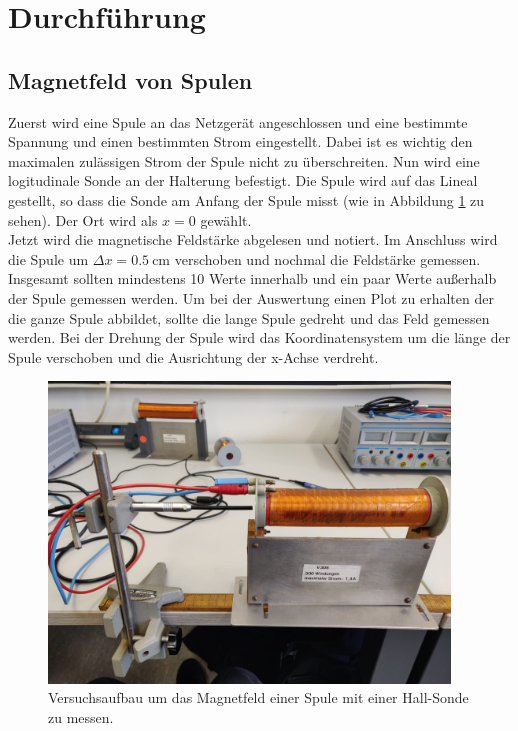 \section{Durchführung}
\label{sec:Durchführung}
\subsection{Magnetfeld von Spulen}
Zuerst wird eine Spule an das Netzgerät angeschlossen und eine bestimmte
Spannung und einen bestimmten Strom eingestellt. Dabei ist es wichtig den maximalen
zulässigen Strom der Spule nicht zu überschreiten.
Nun wird eine logitudinale Sonde an der Halterung befestigt. Die Spule wird auf das Lineal gestellt, so dass
die Sonde am Anfang der Spule misst (wie in Abbildung \ref{fig:spule_lang} zu sehen). Der Ort wird als $x=0$ gewählt.\\
Jetzt wird die magnetische Feldstärke abgelesen und notiert. Im Anschluss wird die Spule um $\Delta x = \SI{0.5}{\cm}$ verschoben und
nochmal die Feldstärke gemessen. Insgesamt sollten mindestens 10 Werte innerhalb und ein paar Werte außerhalb der Spule gemessen werden.
Um bei der Auswertung einen Plot zu erhalten der die ganze Spule abbildet, sollte die lange Spule gedreht und das Feld gemessen werden.
Bei der Drehung der Spule wird das Koordinatensystem um die länge der Spule verschoben und die Ausrichtung der x-Achse verdreht.
\begin{figure}
    \centering
    \includegraphics[height=8cm]{content/spule_lang.jpg}
    \caption{Versuchsaufbau um das Magnetfeld einer Spule mit einer Hall-Sonde zu messen.}
    \label{fig:spule_lang}
\end{figure}
\FloatBarrier
